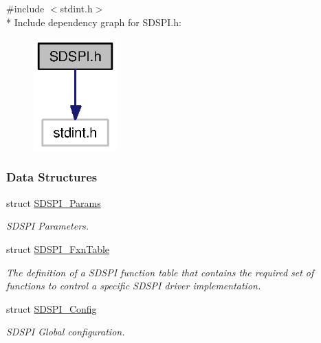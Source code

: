 {\ttfamily \#include $<$stdint.\+h$>$}\\*
Include dependency graph for S\+D\+S\+P\+I.\+h\+:
\nopagebreak
\begin{figure}[H]
\begin{center}
\leavevmode
\includegraphics[width=91pt]{_s_d_s_p_i_8h__incl}
\end{center}
\end{figure}
\subsubsection*{Data Structures}
\begin{DoxyCompactItemize}
\item 
struct \hyperlink{struct_s_d_s_p_i___params}{S\+D\+S\+P\+I\+\_\+\+Params}
\begin{DoxyCompactList}\small\item\em S\+D\+S\+P\+I Parameters. \end{DoxyCompactList}\item 
struct \hyperlink{struct_s_d_s_p_i___fxn_table}{S\+D\+S\+P\+I\+\_\+\+Fxn\+Table}
\begin{DoxyCompactList}\small\item\em The definition of a S\+D\+S\+P\+I function table that contains the required set of functions to control a specific S\+D\+S\+P\+I driver implementation. \end{DoxyCompactList}\item 
struct \hyperlink{struct_s_d_s_p_i___config}{S\+D\+S\+P\+I\+\_\+\+Config}
\begin{DoxyCompactList}\small\item\em S\+D\+S\+P\+I Global configuration. \end{DoxyCompactList}\end{DoxyCompactItemize}
